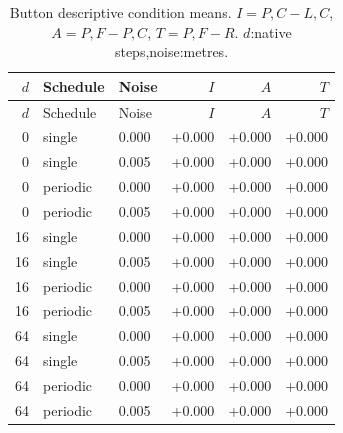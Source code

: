 \clearpage
\begin{longtable}{rllrrr}
\caption{Button descriptive condition means. $I=P,C-L,C$, $A=P,F-P,C$, $T=P,F-R$. $d$:native steps,noise:metres.}\label{tab:buttonbreak}\\
\toprule $d$ & Schedule & Noise & $I$ & $A$ & $T$\\\midrule\endfirsthead
\toprule $d$ & Schedule & Noise & $I$ & $A$ & $T$\\\midrule\endhead
0 & single & 0.000 & +0.000 & +0.000 & +0.000\\
0 & single & 0.005 & +0.000 & +0.000 & +0.000\\
0 & periodic & 0.000 & +0.000 & +0.000 & +0.000\\
0 & periodic & 0.005 & +0.000 & +0.000 & +0.000\\
16 & single & 0.000 & +0.000 & +0.000 & +0.000\\
16 & single & 0.005 & +0.000 & +0.000 & +0.000\\
16 & periodic & 0.000 & +0.000 & +0.000 & +0.000\\
16 & periodic & 0.005 & +0.000 & +0.000 & +0.000\\
64 & single & 0.000 & +0.000 & +0.000 & +0.000\\
64 & single & 0.005 & +0.000 & +0.000 & +0.000\\
64 & periodic & 0.000 & +0.000 & +0.000 & +0.000\\
64 & periodic & 0.005 & +0.000 & +0.000 & +0.000\\
\bottomrule\end{longtable}
